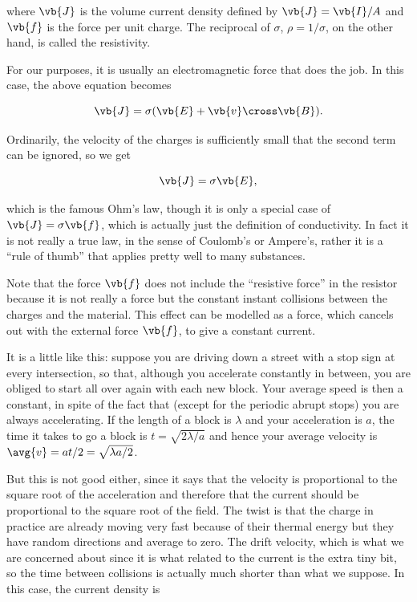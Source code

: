 \documentclass[english,a4paper,12pt]{report}
\begin{document}
where \(\vb{J} \) is the volume current density defined by \(\vb{J} = \vb{I} /A \) and \(\vb{f} \) is the force per unit charge. The reciprocal of \(\sigma \), \(\rho = 1 /\sigma  \), on the other hand, is called the resistivity.  

For our purposes, it is usually an electromagnetic force that does the job. In this case, the above equation becomes

\begin{equation}
    \vb{J} = \sigma (\vb{E} + \vb{v} \cross \vb{B} ).
\end{equation}

Ordinarily, the velocity of the charges is sufficiently small that the second term can be ignored, so we get

\begin{equation}
    \vb{J} = \sigma \vb{E} ,
\end{equation}

which is the famous Ohm's law, though it is only a special case of \(\vb{J} = \sigma \vb{f} \), which is actually just the definition of conductivity. In fact it is not really a true law, in the sense of Coulomb's or Ampere's, rather it is a ``rule of thumb'' that applies pretty well to many substances.

Note that the force \(\vb{f}\) does not include the ``resistive force'' in the resistor because it is not really a force but the constant instant collisions between the charges and the material. This effect can be modelled as a force, which cancels out with the external force \(\vb{f}\), to give a constant current.

It is a little like this: suppose you are driving down a street with a stop sign at every intersection, so that, although you accelerate constantly in between, you are obliged to start all over again with each new block. Your average speed is then a constant, in spite of the fact that (except for the periodic abrupt stops) you are always accelerating. If the length of a block is \(\lambda \)  and your acceleration is \(a\), the time it takes to go a block is \(t = \sqrt{2 \lambda /a} \) and hence your average velocity is \( \avg{v} =at /2 = \sqrt{\lambda a /2 }  \). 

But this is not good either, since it says that the velocity is proportional to the square root of the acceleration and therefore that the current should be proportional to the square root of the field. The twist is that the charge in practice are already moving very fast because of their thermal energy but they have random directions and average to zero. The drift velocity, which is what we are concerned about since it is what related to the current is the extra tiny bit, so the time between collisions is actually much shorter than what we suppose. In this case, the current density is
\end{document}
